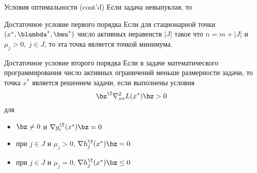 \documentclass[12pt]{beamer}
\begin{document}
\begin{frame}{Условия оптимальности (cont'd)}
\small
Если задача невыпуклая, то
\begin{block}{Достаточное условие первого порядка}
\small
Если для стационарной точки $(x^*, \blambda^*, \bmu^*)$ число активных неравенств $|J|$ такое что $n = m + |J|$ и $\mu_j > 0, \; j \in J$, то эта точка является точкой минимума.
\end{block}

\begin{block}{Достаточное условие второго порядка}
\small
Если в задаче математического программирования число активных ограничений меньше размерности задачи, то точка $x^*$ является решением задачи, если выполнены условия
\vspace{-3mm}
\[
\bz^{\T}\nabla_{xx}^2 L(x^*)\bz > 0
\vspace{-3mm}
\] 
для 
\vspace{-4mm}
\begin{itemize}
\item $\bz \neq 0$ и $\nabla g^{\T}_i(x^*)\bz = 0$
\vspace{-3mm}
\item при $j \in J$ и $\mu_j > 0$, $\nabla h^{\T}_j(x^*) \bz = 0$
\vspace{-3mm}
\item при $j \in J$ и $\mu_j = 0$, $\nabla h^{\T}_j(x^*) \bz \leq 0$
\end{itemize}
\end{block}

\end{frame}
\end{document}
